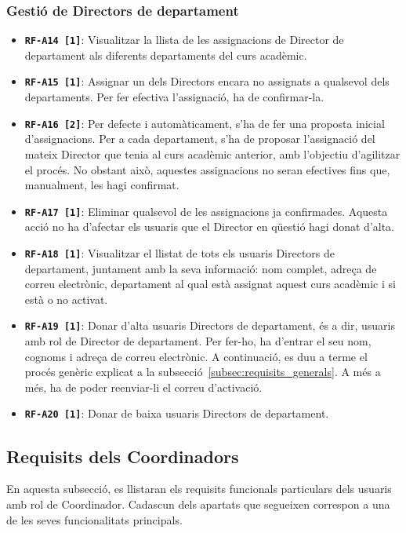 \documentclass[a4paper,12pt]{ThesisStyle}
\begin{document}
\subsubsection{Gestió de Directors de departament}
\begin{itemize}
  \item \texttt{\textbf{RF-A14 [1]}}: Visualitzar la llista de les assignacions de Director de departament als diferents departaments del curs acadèmic.
  \item \texttt{\textbf{RF-A15 [1]}}: Assignar un dels Directors encara no assignats a qualsevol dels departaments. Per fer efectiva l'assignació, ha de confirmar-la.
  \item \texttt{\textbf{RF-A16 [2]}}: Per defecte i automàticament, s'ha de fer una proposta inicial d'assignacions. Per a cada departament, s'ha de proposar l'assignació del mateix Director que tenia al curs acadèmic anterior, amb l'objectiu d'agilitzar el procés. No obstant això, aquestes assignacions no seran efectives fins que, manualment, les hagi confirmat.
  \item \texttt{\textbf{RF-A17 [1]}}: Eliminar qualsevol de les assignacions ja confirmades. Aquesta acció no ha d'afectar els usuaris que el Director en qüestió hagi donat d'alta.
  \item \texttt{\textbf{RF-A18 [1]}}: Visualitzar el llistat de tots els usuaris Directors de departament, juntament amb la seva informació: nom complet, adreça de correu electrònic, departament al qual està assignat aquest curs acadèmic i si està o no activat.
  \item \texttt{\textbf{RF-A19 [1]}}: Donar d'alta usuaris Directors de departament, és a dir, usuaris amb rol de Director de departament. Per fer-ho, ha d'entrar el seu nom, cognoms i adreça de correu electrònic. A continuació, es duu a terme el procés genèric explicat a la subsecció~\ref{subsec:requisits_generals}. A més a més, ha de poder reenviar-li el correu d'activació.
  \item \texttt{\textbf{RF-A20 [1]}}: Donar de baixa usuaris Directors de departament.
\end{itemize}

\subsection{Requisits dels Coordinadors}
\label{subsec:requisits_coordinadors}

En aquesta subsecció, es llistaran els requisits funcionals particulars dels usuaris amb rol de Coordinador. Cadascun dels apartats que segueixen correspon a una de les seves funcionalitats principals.
\end{document}
